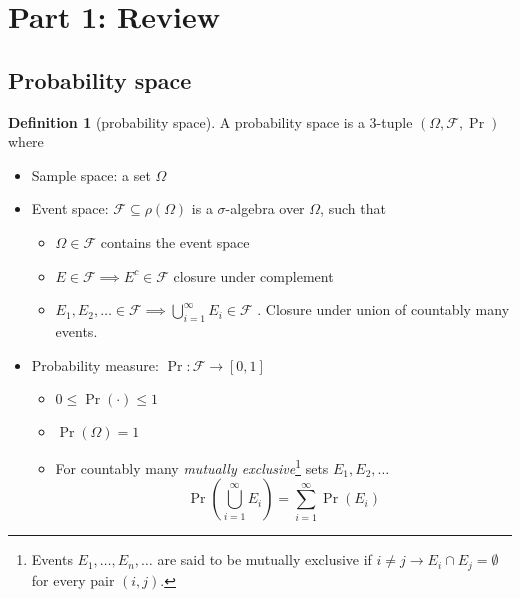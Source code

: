 \documentclass{article}
\theoremstyle{definition}
\newtheorem{definition}[theorem]{Definition}
\theoremstyle{remark}
\begin{document}
\pagebreak

\section{Part 1: Review}

\subsection{Probability space}

\begin{definition}[probability space]
	A probability space is a 3-tuple \((\Omega,\mathcal{F},\Pr)\) where
	\begin{itemize}
		\item Sample space: a set \(\Omega\)
		\item Event space: \(\mathcal{F}\subseteq \rho(\Omega)\) is a \(\sigma\)-algebra over \(\Omega\), such that
		      \begin{itemize}
			      \item \(\Omega\in \mathcal{F}\) contains the event space
			      \item \(E\in\mathcal{F} \implies E^c\in \mathcal{F}\) closure under complement
			      \item \(E_1,E_2,\ldots\in\mathcal{F} \implies \bigcup_{i=1}^{\infty} E_i\in \mathcal{F}\) .
			            Closure under union of countably many events.
		      \end{itemize}
		\item Probability measure: \(\Pr: \mathcal{F}\to [0,1]\)
		      \begin{itemize}
			      \item \(0\leq \Pr(\cdot)\leq 1\)
			      \item \(\Pr(\Omega)=1\)
			      \item For countably many \emph{mutually exclusive}\footnote{
				            Events \(E_1,\ldots,E_n,\ldots\) are said to be mutually exclusive if \(i\neq j\to E_i\cap E_j=\emptyset\) for every pair \((i,j)\).
			            } sets \(E_1,E_2,\ldots\)
			            \[
				            \Pr\left(\bigcup_{i=1}^{\infty} E_i\right) = \sum_{i=1}^{\infty} \Pr(E_i)
			            \]
		      \end{itemize}
	\end{itemize}
\end{definition}
\end{document}

